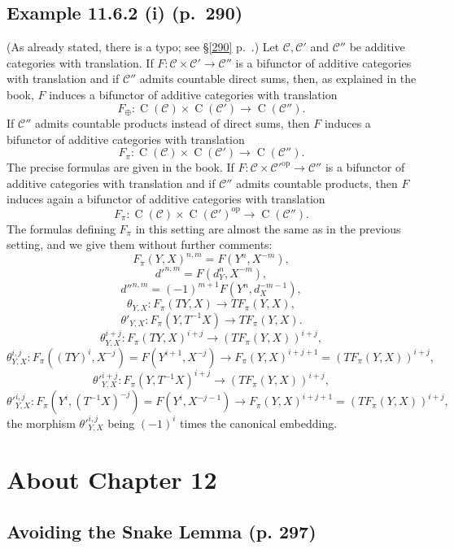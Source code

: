 \documentclass[12pt]{article}
\theoremstyle{remark}
\theoremstyle{definition}
\newcommand{\C}{\mathcal C}
\DeclareMathOperator{\op}{op}
\begin{document}

\subsection{Example 11.6.2 (i) (p.~290)} 

(As already stated, there is a typo; see \S\ref{290} p.~\pageref{290}.) Let $\C,\C'$ and $\C''$ be additive categories with translation. If $F:\C\times\C'\to\C''$ is a bifunctor of additive categories with translation and if $\C''$ admits countable direct sums, then, as explained in the book, $F$ induces a bifunctor of additive categories with translation 
$$
F_\oplus:\operatorname{C}(\C)\times\operatorname{C}(\C')\to\operatorname{C}(\C'').
$$ 
If $\C''$ admits countable products instead of direct sums, then $F$ induces a bifunctor of additive categories with translation 
$$
F_\pi:\operatorname{C}(\C)\times\operatorname{C}(\C')\to\operatorname{C}(\C'').
$$ 
The precise formulas are given in the book. If $F:\C\times\C'^\op\to\C''$ is a bifunctor of additive categories with translation and if $\C''$ admits countable products, then $F$ induces again a bifunctor of additive categories with translation 
$$
F_\pi:\operatorname{C}(\C)\times\operatorname{C}(\C')^{\op}\to\operatorname{C}(\C'').
$$ 
The formulas defining $F_\pi$ in this setting are almost the same as in the previous setting, and we give them without further comments:
$$
F_\pi(Y,X)^{n,m}=F(Y^n,X^{-m}),
$$
$$
d'^{n,m}=F(d_Y^n,X^{-m}),
$$
$$
d''^{n,m}=(-1)^{m+1}F(Y^n,d_X^{-m-1}),
$$
$$
\theta_{Y,X}:F_\pi(TY,X)\to TF_\pi(Y,X),
$$
$$
\theta'_{Y,X}:F_\pi(Y,T^{-1}X)\to TF_\pi(Y,X).
$$
$$
\theta_{Y,X}^{i+j}:F_\pi(TY,X)^{i+j}\to(TF_\pi(Y,X))^{i+j},
$$
$$
\theta_{Y,X}^{i,j}:F_\pi((TY)^i,X^{-j})=F(Y^{i+1},X^{-j})\to F_\pi(Y,X)^{i+j+1}=(TF_\pi(Y,X))^{i+j},
$$
$$
{\theta'}_{Y,X}^{i+j}:F_\pi(Y,T^{-1}X)^{i+j}\to(TF_\pi(Y,X))^{i+j},
$$
$$
{\theta'}_{Y,X}^{i,j}:F_\pi(Y^i,(T^{-1}X)^{-j})=F(Y^i,X^{-j-1})\to F_\pi(Y,X)^{i+j+1}=(TF_\pi(Y,X))^{i+j},
$$
the morphism ${\theta'}_{Y,X}^{i,j}$ being $(-1)^i$ times the canonical embedding. 


\section{About Chapter 12}

\subsection{Avoiding the Snake Lemma (p. 297)}  
\end{document}
